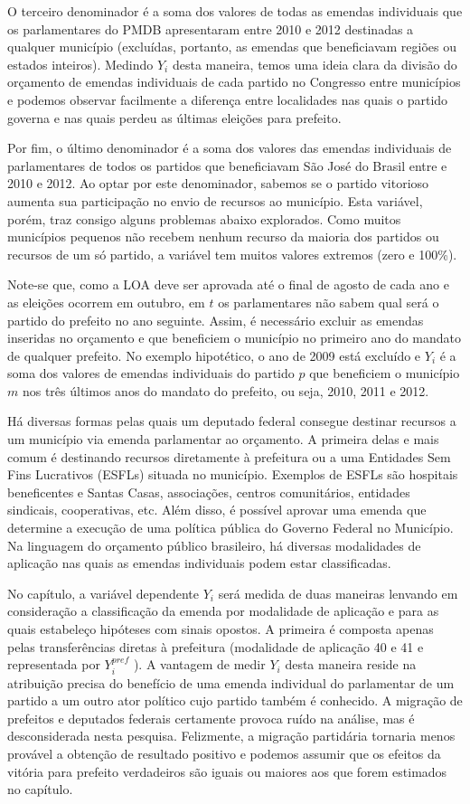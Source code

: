 O terceiro denominador é a soma dos valores de todas as emendas individuais que os parlamentares do PMDB apresentaram entre 2010 e 2012 destinadas a qualquer município (excluídas, portanto, as emendas que beneficiavam regiões ou estados inteiros). Medindo $Y_{i}$ desta maneira, temos uma ideia clara da divisão do orçamento de emendas individuais de cada partido no Congresso entre municípios e podemos observar facilmente a diferença entre localidades nas quais o partido governa e nas quais perdeu as últimas eleições para prefeito.

Por fim, o último denominador é a soma dos valores das emendas individuais de parlamentares de todos os partidos que beneficiavam São José do Brasil entre e 2010 e 2012. Ao optar por este denominador, sabemos se o partido vitorioso aumenta sua participação no envio de recursos ao município. Esta variável, porém, traz consigo alguns problemas abaixo explorados. Como muitos municípios pequenos não recebem nenhum recurso da maioria dos partidos ou recursos de um só partido, a variável tem muitos valores extremos (zero e 100\%).

Note-se que, como a LOA deve ser aprovada até o final de agosto de cada ano e as eleições ocorrem em outubro, em $t$ os parlamentares não sabem qual será o partido do prefeito no ano seguinte. Assim, é necessário excluir as emendas inseridas no orçamento e que beneficiem o município no primeiro ano do mandato de qualquer prefeito. No exemplo hipotético, o ano de 2009 está excluído e $Y_{i}$ é a soma dos valores de emendas individuais do partido $p$ que beneficiem o município $m$ nos três últimos anos do mandato do prefeito, ou seja, 2010, 2011 e 2012.

Há diversas formas pelas quais um deputado federal consegue destinar recursos a um município via emenda parlamentar ao orçamento. A primeira delas e mais comum é destinando recursos diretamente à prefeitura ou a uma Entidades Sem Fins Lucrativos (ESFLs) situada no município. Exemplos de ESFLs são hospitais beneficentes e Santas Casas, associações, centros comunitários, entidades sindicais, cooperativas, etc. Além disso, é possível aprovar uma emenda que determine a execução de uma política pública do Governo Federal no Município. Na linguagem do orçamento público brasileiro, há diversas modalidades de aplicação nas quais as emendas individuais podem estar classificadas.

No capítulo, a variável dependente $Y_{i}$ será medida de duas maneiras lenvando em consideração a classificação da emenda por modalidade de aplicação e para as quais estabeleço hipóteses com sinais opostos. A primeira é composta apenas pelas transferências diretas à prefeitura (modalidade de aplicação 40 e 41 e representada por $Y_{i}^{pref}$ ). A vantagem de medir $Y_{i}$ desta maneira reside na atribuição precisa do benefício de uma emenda individual do parlamentar de um partido a um outro ator político cujo partido também é conhecido. A migração de prefeitos e deputados federais certamente provoca ruído na análise, mas é desconsiderada nesta pesquisa. Felizmente, a migração partidária tornaria menos provável a obtenção de resultado positivo e podemos assumir que os efeitos da vitória para prefeito verdadeiros são iguais ou maiores aos que forem estimados no capítulo.

